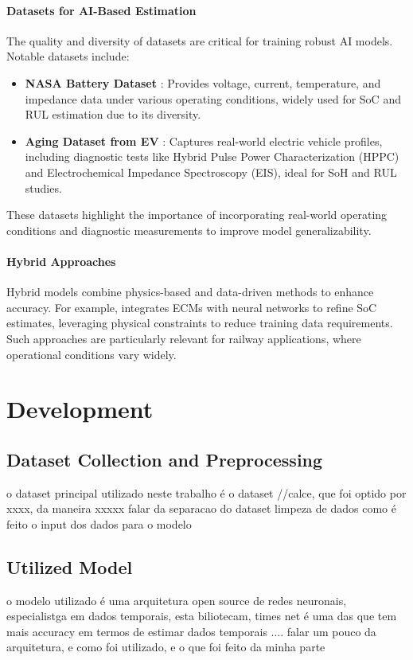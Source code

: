 \subsubsection{Datasets for AI-Based Estimation}
The quality and diversity of datasets are critical for training robust AI models. Notable datasets include:
\begin{itemize}
    \item \textbf{NASA Battery Dataset} \cite{Ref1}: Provides voltage, current, temperature, and impedance data under various operating conditions, widely used for SoC and RUL estimation due to its diversity.
    \item \textbf{Aging Dataset from EV} \cite{Ref3}: Captures real-world electric vehicle profiles, including diagnostic tests like Hybrid Pulse Power Characterization (HPPC) and Electrochemical Impedance Spectroscopy (EIS), ideal for SoH and RUL studies.
\end{itemize}
These datasets highlight the importance of incorporating real-world operating conditions and diagnostic measurements to improve model generalizability.

\subsubsection{Hybrid Approaches}
Hybrid models combine physics-based and data-driven methods to enhance accuracy. For example, \cite{Ref5} integrates ECMs with neural networks to refine SoC estimates, leveraging physical constraints to reduce training data requirements. Such approaches are particularly relevant for railway applications, where operational conditions vary widely.


\chapter{Development}
\label{ch:Development}
\lipsum[1]
\section{Dataset Collection and Preprocessing}

o dataset principal utilizado neste trabalho é o dataset //calce, que foi optido por xxxx, da maneira xxxxx
falar da separacao do dataset
limpeza de dados
como é feito o input dos dados para o modelo
\section{Utilized Model}
o modelo utilizado é uma arquitetura open source de redes neuronais, especialistga em dados temporais, esta biliotecam, times net é uma das que tem mais accuracy em termos de estimar dados temporais
.... falar um pouco da arquitetura, e como foi utilizado, e o que foi feito da minha parte

